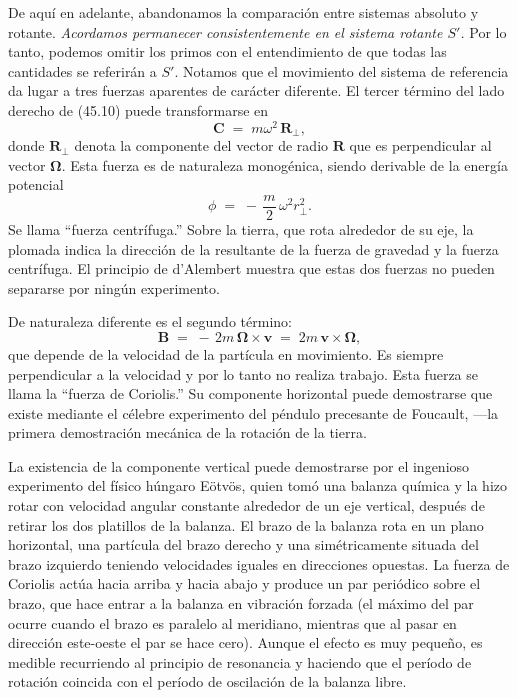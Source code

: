 \documentclass[12pt,a4paper]{book}
\begin{document}
De aquí en adelante, abandonamos la comparación entre sistemas absoluto y rotante. \textit{Acordamos permanecer consistentemente en el sistema rotante $S'$.} Por lo tanto, podemos omitir los primos con el entendimiento de que todas las cantidades se referirán a $S'$. Notamos que el movimiento del sistema de referencia da lugar a tres fuerzas aparentes de carácter diferente. El tercer término del lado derecho de (45.10) puede transformarse en
\begin{equation}
\mathbf{C} \;=\; m\omega^2\,\mathbf{R}_\perp, \tag{45.11}
\end{equation}
donde $\mathbf{R}_\perp$ denota la componente del vector de radio $\mathbf{R}$ que es perpendicular al vector $\mathbf{\Omega}$. Esta fuerza es de naturaleza monogénica, siendo derivable de la energía potencial
\begin{equation}
\phi \;=\; -\,\frac{m}{2}\,\omega^2 r_\perp^2. \tag{45.12}
\end{equation}
Se llama ``fuerza centrífuga.'' Sobre la tierra, que rota alrededor de su eje, la plomada indica la dirección de la resultante de la fuerza de gravedad y la fuerza centrífuga. El principio de d'Alembert muestra que estas dos fuerzas no pueden separarse por ningún experimento.

De naturaleza diferente es el segundo término:
\begin{equation}
\mathbf{B} \;=\; -\,2m\,\mathbf{\Omega} \times \mathbf{v} \;=\; 2m\,\mathbf{v} \times \mathbf{\Omega}, \tag{45.13}
\end{equation}
que depende de la velocidad de la partícula en movimiento. Es siempre perpendicular a la velocidad y por lo tanto no realiza trabajo. Esta fuerza se llama la ``fuerza de Coriolis.'' Su componente horizontal puede demostrarse que existe mediante el célebre experimento del péndulo precesante de Foucault, ---la primera demostración mecánica de la rotación de la tierra.

La existencia de la componente vertical puede demostrarse por el ingenioso experimento del físico húngaro Eötvös, quien tomó una balanza química y la hizo rotar con velocidad angular constante alrededor de un eje vertical, después de retirar los dos platillos de la balanza. El brazo de la balanza rota en un plano horizontal, una partícula del brazo derecho y una simétricamente situada del brazo izquierdo teniendo velocidades iguales en direcciones opuestas. La fuerza de Coriolis actúa hacia arriba y hacia abajo y produce un par periódico sobre el brazo, que hace entrar a la balanza en vibración forzada (el máximo del par ocurre cuando el brazo es paralelo al meridiano, mientras que al pasar en dirección este-oeste el par se hace cero). Aunque el efecto es muy pequeño, es medible recurriendo al principio de resonancia y haciendo que el período de rotación coincida con el período de oscilación de la balanza libre.
\end{document}
